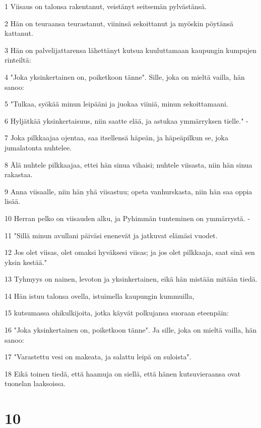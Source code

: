 \par 1 Viisaus on talonsa rakentanut, veistänyt seitsemän pylvästänsä.
\par 2 Hän on teuraansa teurastanut, viininsä sekoittanut ja myöskin pöytänsä kattanut.
\par 3 Hän on palvelijattarensa lähettänyt kutsua kuuluttamaan kaupungin kumpujen rinteiltä:
\par 4 "Joka yksinkertainen on, poiketkoon tänne". Sille, joka on mieltä vailla, hän sanoo:
\par 5 "Tulkaa, syökää minun leipääni ja juokaa viiniä, minun sekoittamaani.
\par 6 Hyljätkää yksinkertaisuus, niin saatte elää, ja astukaa ymmärryksen tielle." -
\par 7 Joka pilkkaajaa ojentaa, saa itsellensä häpeän, ja häpeäpilkun se, joka jumalatonta nuhtelee.
\par 8 Älä nuhtele pilkkaajaa, ettei hän sinua vihaisi; nuhtele viisasta, niin hän sinua rakastaa.
\par 9 Anna viisaalle, niin hän yhä viisastuu; opeta vanhurskasta, niin hän saa oppia lisää.
\par 10 Herran pelko on viisauden alku, ja Pyhimmän tunteminen on ymmärrystä. -
\par 11 "Sillä minun avullani päiväsi enenevät ja jatkuvat elämäsi vuodet.
\par 12 Jos olet viisas, olet omaksi hyväksesi viisas; ja jos olet pilkkaaja, saat sinä sen yksin kestää."
\par 13 Tyhmyys on nainen, levoton ja yksinkertainen, eikä hän mistään mitään tiedä.
\par 14 Hän istuu talonsa ovella, istuimella kaupungin kummuilla,
\par 15 kutsumassa ohikulkijoita, jotka käyvät polkujansa suoraan eteenpäin:
\par 16 "Joka yksinkertainen on, poiketkoon tänne". Ja sille, joka on mieltä vailla, hän sanoo:
\par 17 "Varastettu vesi on makeata, ja salattu leipä on suloista".
\par 18 Eikä toinen tiedä, että haamuja on siellä, että hänen kutsuvieraansa ovat tuonelan laaksoissa.

\chapter{10}

